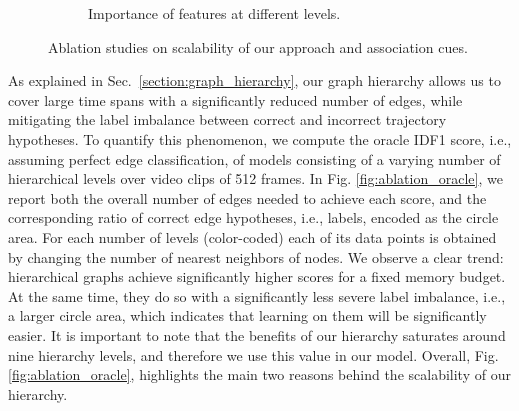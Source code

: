 \documentclass[10pt,twocolumn,letterpaper]{article}
\begin{document}
{{\begin{figure*}
\begin{subfigure}[b]{0.30\textwidth}
         \caption{Importance of features at different levels.}
         \label{fig:ablation_features}
     \end{subfigure}
        \caption{Ablation studies on scalability of our approach and association cues. }
        \label{fig:three graphs}
\end{figure*}


 As explained in Sec.~\ref{section:graph_hierarchy}, our graph hierarchy allows us to cover large time spans with a significantly reduced number of edges, while mitigating the label imbalance between correct and incorrect trajectory hypotheses. To quantify this phenomenon, we compute the oracle IDF1 score, i.e., assuming perfect edge classification, of models consisting of a varying number of hierarchical levels over video clips of 512 frames. In Fig. \ref{fig:ablation_oracle}, we report both the overall number of edges needed to achieve each score, and the corresponding ratio of correct edge hypotheses, i.e., labels, encoded as the circle area. For each number of levels (color-coded) each of its data points is obtained by changing the number of nearest neighbors of nodes.
We observe a clear trend: hierarchical graphs achieve significantly higher scores for a fixed memory budget. At the same time, they do so with a significantly less severe label imbalance, i.e., a larger circle area, which indicates that learning on them will be significantly easier. It is important to note that the benefits of our hierarchy saturates around nine hierarchy levels, and therefore we use this value in our model. Overall, Fig. \ref{fig:ablation_oracle}, highlights the main two reasons behind the scalability of our hierarchy.




\begin{table}[h]
\center
\tabcolsep=0.11cm

\end{table}}}
\end{document}

